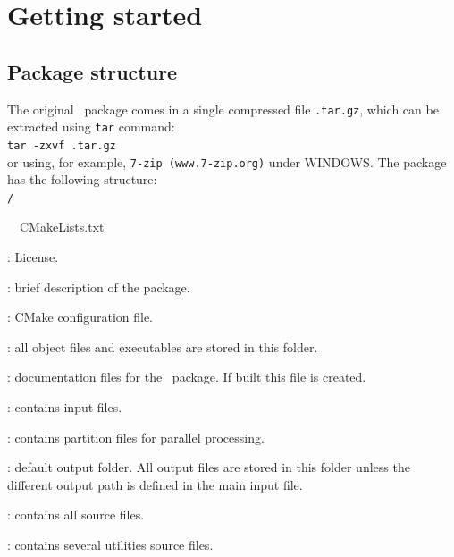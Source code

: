 \chapter{Getting started}
\label{chap:2}
\section{Package structure}
The original \pack\ package comes in a single compressed file \linebreak\texttt{\pack.tar.gz}, which can be extracted using \texttt{tar} command:\\

\texttt{tar -zxvf \pack.tar.gz}\\

or using, for example, \texttt{7-zip (www.7-zip.org)} under WINDOWS. The package has the following structure:\\



\texttt{\pack/}
\begin{adescription}{~~CMakeLists.txt}
\item[~~COPYING]               : License.
\item[~~README]                : brief description of the package.
\item[~~CMakeLists.txt]        : CMake configuration file.
\item[~~bin/]                  : all object files and executables are stored in this folder.
\item[~~doc/]                  : documentation files for the \pack\ package. If built this file is created.
\item[~~input/]                : contains input files.
\item[~~partition/]            : contains partition files for parallel processing.
\item[~~output/]               : default output folder. All output files are stored in this folder unless the different output path is defined in the main input file.
\item[~~src/]                  : contains all source files.
\item[~~util/]                  : contains several utilities source files.
\end{adescription}

